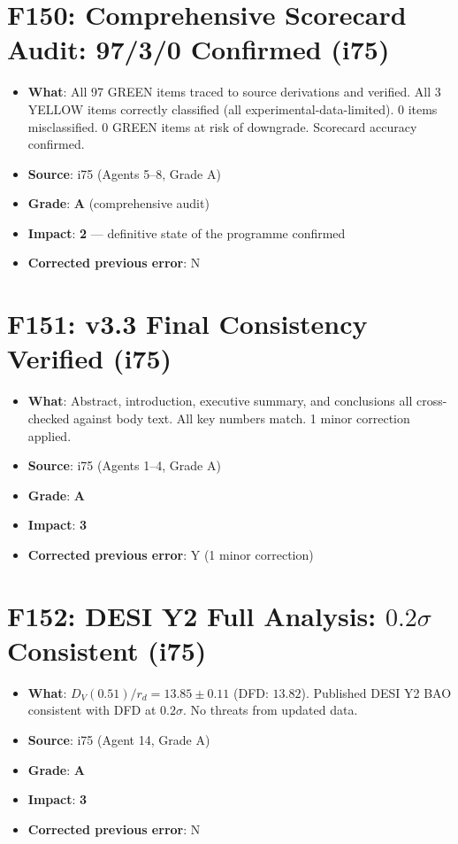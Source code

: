 \documentclass[11pt,a4paper]{article}
\newcommand{\grade}[1]{\textbf{#1}}
\newcommand{\impact}[1]{\textbf{#1}}
\begin{document}
\section{F150: Comprehensive Scorecard Audit: 97/3/0 Confirmed (i75)}
\begin{itemize}[nosep]
\item \textbf{What}: All 97 GREEN items traced to source derivations and verified. All 3 YELLOW items correctly classified (all experimental-data-limited). 0 items misclassified. 0 GREEN items at risk of downgrade. Scorecard accuracy confirmed.
\item \textbf{Source}: i75 (Agents 5--8, Grade A)
\item \textbf{Grade}: \grade{A} (comprehensive audit)
\item \textbf{Impact}: \impact{2} --- definitive state of the programme confirmed
\item \textbf{Corrected previous error}: N
\end{itemize}

\section{F151: v3.3 Final Consistency Verified (i75)}
\begin{itemize}[nosep]
\item \textbf{What}: Abstract, introduction, executive summary, and conclusions all cross-checked against body text. All key numbers match. 1 minor correction applied.
\item \textbf{Source}: i75 (Agents 1--4, Grade A)
\item \textbf{Grade}: \grade{A}
\item \textbf{Impact}: \impact{3}
\item \textbf{Corrected previous error}: Y (1 minor correction)
\end{itemize}

\section{F152: DESI Y2 Full Analysis: $0.2\sigma$ Consistent (i75)}
\begin{itemize}[nosep]
\item \textbf{What}: $D_V(0.51)/r_d = 13.85 \pm 0.11$ (DFD: $13.82$). Published DESI Y2 BAO consistent with DFD at $0.2\sigma$. No threats from updated data.
\item \textbf{Source}: i75 (Agent 14, Grade A)
\item \textbf{Grade}: \grade{A}
\item \textbf{Impact}: \impact{3}
\item \textbf{Corrected previous error}: N
\end{itemize}
\end{document}
